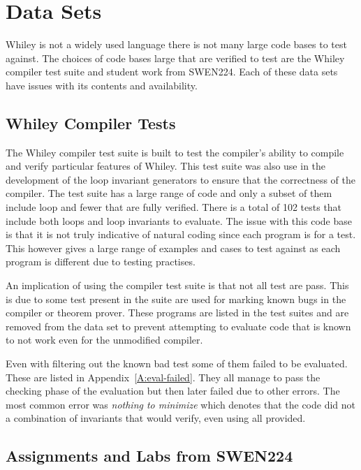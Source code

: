 \section{Data Sets}

Whiley is not a widely used language there is not many large code bases
to test against.
The choices of code bases large that are verified to test are the
Whiley compiler test suite and student work from SWEN224.
Each of these data sets have issues with its contents and availability.

\subsection{Whiley Compiler Tests}

The Whiley compiler test suite is built to test the compiler's ability to
compile and verify particular features of Whiley.
This test suite was also use in the development of the loop invariant
generators to ensure that the correctness of the compiler.
The test suite has a large range of code and only a subset of them include
loop and fewer that are fully verified.
There is a total of 102 tests that include both loops and loop invariants to
evaluate.
The issue with this code base is that it is not truly indicative of
natural coding since each program is for a test.
This however gives a large range of examples and cases to test against
as each program is different due to testing practises.

An implication of using the compiler test suite is that not all test
are pass.
This is due to some test present in the suite are used for marking
known bugs in the compiler or theorem prover.
These programs are listed in the test suites and are removed from
the data set to prevent attempting to evaluate code that is known to
not work even for the unmodified compiler.

Even with filtering out the known bad test some of them failed to be evaluated.
These are listed in Appendix~\ref{A:eval-failed}.
They all manage to pass the checking phase of the evaluation but then later
failed due to other errors. The most common error was \textit{nothing to minimize}
which denotes that the code did not a combination of invariants that would verify, 
even using all provided.

\subsection{Assignments and Labs from SWEN224}

